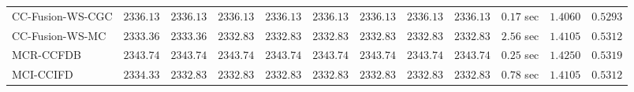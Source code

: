 \begin{table}[H]
\begin{tabular}{lrrrrrrrrrrr}
    CC-Fusion-WS-CGC & $      2336.13$ & $      2336.13$ & $      2336.13$ & $      2336.13$ & $      2336.13$ & $      2336.13$ & $      2336.13$ & $      2336.13$ & $         0.17$ sec    & $       1.4060$  & $       0.5293$ \\ 
     CC-Fusion-WS-MC & $      2333.36$ & $      2333.36$ & $      2332.83$ & $      2332.83$ & $      2332.83$ & $      2332.83$ & $      2332.83$ & $      2332.83$ & $         2.56$ sec    & $       1.4105$  & $       0.5312$ \\ 
\cmidrule{1-1} 
           MCR-CCFDB & $      2343.74$ & $      2343.74$ & $      2343.74$ & $      2343.74$ & $      2343.74$ & $      2343.74$ & $      2343.74$ & $      2343.74$ & $         0.25$ sec    & $       1.4250$  & $       0.5319$ \\ 
\cmidrule{1-1} 
           MCI-CCIFD & $      2334.33$ & $      2332.83$ & $      2332.83$ & $      2332.83$ & $      2332.83$ & $      2332.83$ & $      2332.83$ & $      2332.83$ & $         0.78$ sec    & $       1.4105$  & $       0.5312$ \\ 
\bottomrule
\end{tabular}
\end{table}

